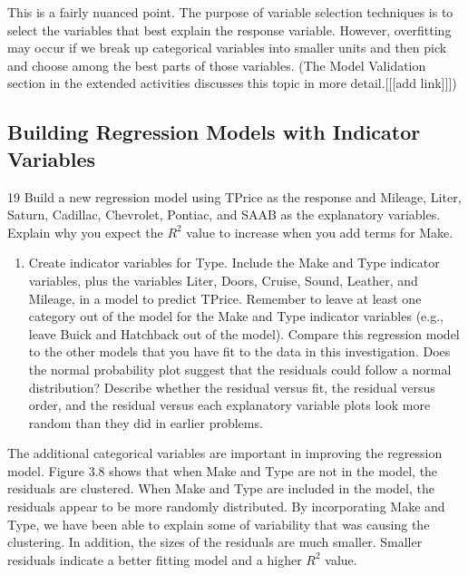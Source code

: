 \documentclass[
]{report}
\providecommand{\tightlist}{%
  \setlength{\itemsep}{0pt}\setlength{\parskip}{0pt}}
\theoremstyle{definition}
\theoremstyle{definition}
\theoremstyle{definition}
\theoremstyle{definition}
\theoremstyle{remark}
\begin{document}
This is a fairly nuanced point. The purpose of variable selection techniques is to select the variables that best explain the response variable. However, overfitting may occur if we break up categorical variables into smaller units and then pick and choose among the best parts of those variables. (The Model Validation section
in the extended activities discusses this topic in more detail.{[}{[}{[}add link{]}{]}{]})

\hypertarget{building-regression-models-with-indicator-variables}{%
\subsection*{Building Regression Models with Indicator Variables}\label{building-regression-models-with-indicator-variables}}

19 Build a new regression model using TPrice as the response and Mileage, Liter, Saturn, Cadillac, Chevrolet, Pontiac, and SAAB as the explanatory variables. Explain why you expect the \(R^2\) value to increase when you add terms for Make.

\begin{enumerate}
\def\labelenumi{\arabic{enumi}.}
\setcounter{enumi}{19}
\tightlist
\item
  Create indicator variables for Type. Include the Make and Type indicator variables, plus the variables Liter, Doors, Cruise, Sound, Leather, and Mileage, in a model to predict TPrice. Remember to leave at least one category out of the model for the Make and Type indicator variables (e.g., leave Buick and Hatchback out of the model). Compare this regression model to the other models that you have fit
  to the data in this investigation. Does the normal probability plot suggest that the residuals could follow a normal distribution? Describe whether the residual versus fit, the residual versus order, and the residual versus each explanatory variable plots look more random than they did in earlier problems.
\end{enumerate}

The additional categorical variables are important in improving the regression model. Figure 3.8 shows that when Make and Type are not in the model, the residuals are clustered. When Make and Type are included in the model, the residuals appear to be more randomly distributed. By incorporating Make and Type, we have been able to explain some of variability that was causing the clustering. In addition, the sizes of the residuals are much smaller. Smaller residuals indicate a better fitting model and a higher \(R^2\) value.
\end{document}
